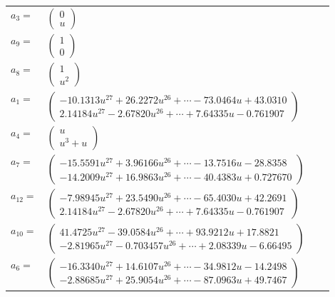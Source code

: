 \documentclass[1p]{elsarticle_modified}
\theoremstyle{definition}
\begin{document}
\begin{tabular}{m{7pt} m{180pt} m{7pt} m{180pt} }
\flushright $a_{3}=$&$\begin{pmatrix}0\\u\end{pmatrix}$ \\
\flushright $a_{9}=$&$\begin{pmatrix}1\\0\end{pmatrix}$ \\
\flushright $a_{8}=$&$\begin{pmatrix}1\\u^2\end{pmatrix}$ \\
\flushright $a_{1}=$&$\begin{pmatrix}-10.1313 u^{27}+26.2272 u^{26}+\cdots-73.0464 u+43.0310\\2.14184 u^{27}-2.67820 u^{26}+\cdots+7.64335 u-0.761907\end{pmatrix}$ \\
\flushright $a_{4}=$&$\begin{pmatrix}u\\u^3+u\end{pmatrix}$ \\
\flushright $a_{7}=$&$\begin{pmatrix}-15.5591 u^{27}+3.96166 u^{26}+\cdots-13.7516 u-28.8358\\-14.2009 u^{27}+16.9863 u^{26}+\cdots-40.4383 u+0.727670\end{pmatrix}$ \\
\flushright $a_{12}=$&$\begin{pmatrix}-7.98945 u^{27}+23.5490 u^{26}+\cdots-65.4030 u+42.2691\\2.14184 u^{27}-2.67820 u^{26}+\cdots+7.64335 u-0.761907\end{pmatrix}$ \\
\flushright $a_{10}=$&$\begin{pmatrix}41.4725 u^{27}-39.0584 u^{26}+\cdots+93.9212 u+17.8821\\-2.81965 u^{27}-0.703457 u^{26}+\cdots+2.08339 u-6.66495\end{pmatrix}$ \\
\flushright $a_{6}=$&$\begin{pmatrix}-16.3340 u^{27}+14.6107 u^{26}+\cdots-34.9812 u-14.2498\\-2.88685 u^{27}+25.9054 u^{26}+\cdots-87.0963 u+49.7467\end{pmatrix}$ \\

\end{tabular}
\end{document}
